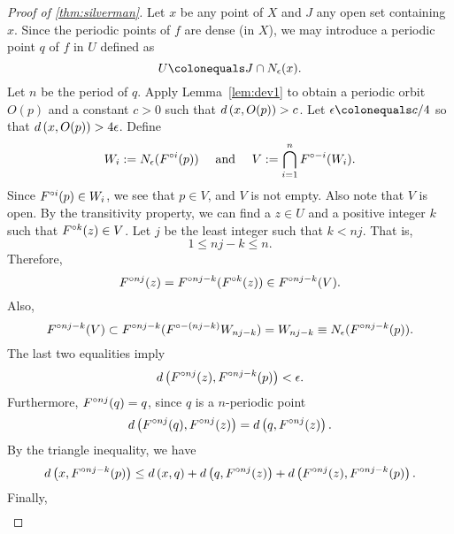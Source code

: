 \documentclass[12pt,draft,twoside]{book}
\begin{document}
\begin{proof}[Proof of \ref{thm:silverman}]
  Let $x$ be any point of $X$ and $J$ any open set containing $x$.
  Since the periodic points of $f$ are dense (in $X$), we may introduce a periodic point
  $q$ of $f$ in $U$ defined as
  \begin{equation*}
    U \ceq J\cap \oball{\epsilon}{x}.
  \end{equation*}
  Let $n$ be the period of $q$.
  Apply Lemma~\ref{lem:dev1} to obtain a periodic orbit $O(p)$ and a constant $c > 0$ such that $d\left( x, O(p) \right) > c$.
  Let $\epsilon \ceq c/4$ so that $d\left( x, O(p) \right) > 4\epsilon$.
  Define
  \begin{equation*}
    W_i := N_\epsilon(F^{\circ i}(p)) \quad\text{ and }\quad V := \bigcap\limits_{i = 1}^{n} F^{\circ -i}(W_i).
  \end{equation*}
  Since $F^{\circ i}(p) \in W_i$, we see that $p \in V$, and $V$ is not empty. 
  Also note that $V$ is open.
  By the transitivity property, we can find a $z\in U$ and a positive integer $k$ such that
  $F^{\circ k}(z) \in V$. Let $j$ be the least integer such that $k < nj$. 
  That is,
  \begin{equation*}
    1 \leq nj - k \leq n.
  \end{equation*}
  Therefore,
  \begin{equation*}
    F^{\circ nj} (z) = F^{\circ nj - k} (F^{\circ k}(z)) \in F^{\circ nj-k}(V).
  \end{equation*}
  Also,
  \begin{equation*}
    F^{\circ nj - k}(V) \subset F^{\circ nj - k}(F^{\circ -(nj - k)} W_{nj-k}) 
    = W_{nj-k}
    \equiv N_\epsilon(F^{\circ nj-k}(p)).
  \end{equation*}
  The last two equalities imply
  \begin{equation*}
    d\left( F^{\circ nj}(z), F^{\circ nj - k}(p) \right) < \epsilon.
  \end{equation*}
  Furthermore, $F^{\circ nj}(q) = q$, since $q$ is a $n$-periodic point 
  \begin{equation*}
    d\left( F^{\circ nj}(q), F^{\circ nj}(z) \right) = d\left( q, F^{\circ nj}(z) \right).
  \end{equation*}
  By the triangle inequality, we have
  \begin{equation*}
    d\left( x, F^{\circ nj-k}(p) \right) \leq d\left( x,q \right) + d\left( q, F^{\circ nj}(z) \right) + d\left( F^{\circ nj}(z), F^{\circ nj - k}(p) \right).
  \end{equation*}
  Finally, 
  \begin{align*}

\end{align*}
\end{proof}
\end{document}
